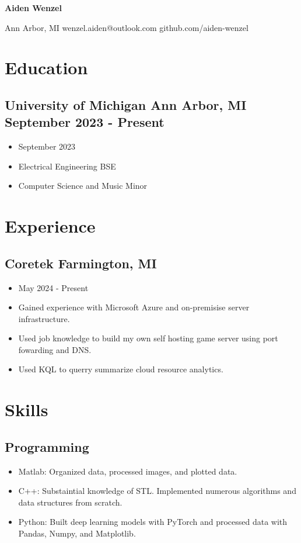 \documentclass[10pt, letterpaper]{article}
\begin{document}
\thispagestyle{empty}
\begin{center}
	\textbf{\huge{Aiden Wenzel}}
	\vspace{3pt}

	Ann Arbor, MI wenzel.aiden@outlook.com github.com/aiden-wenzel
\end{center}

\section*{Education}
\subsection*{University of Michigan  Ann Arbor, MI  September 2023 - Present}
\begin{itemize}[noitemsep]
	\item September 2023
	\item Electrical Engineering BSE
	\item Computer Science and Music Minor
\end{itemize}

\section*{Experience}
\subsection*{Coretek Farmington, MI}
\begin{itemize}[noitemsep]
	\item May 2024 - Present
	\item Gained experience with Microsoft Azure and on-premisise server infrastructure.
	\item Used job knowledge to build my own self hosting game server using port fowarding and DNS.
	\item Used KQL to querry summarize cloud resource analytics.
\end{itemize}

\section*{Skills}
\subsection*{Programming}
\begin{itemize}[noitemsep]
	\item Matlab: Organized data, processed images, and plotted data.
	\item C++: Substaintial knowledge of STL. Implemented numerous algorithms and data structures from scratch.
	\item Python: Built deep learning models with PyTorch and processed data with Pandas, Numpy, and Matplotlib.
\end{itemize}
\end{document}
